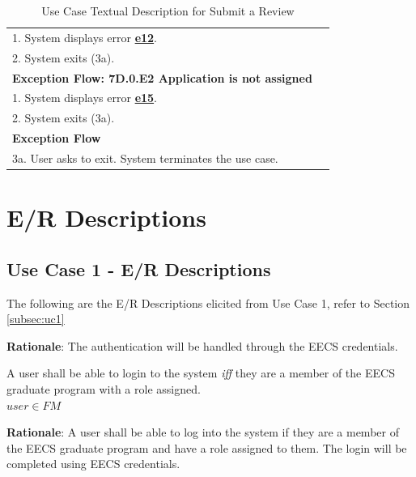 \documentclass[fontsize=12pt,paper=letter,twoside]{scrartcl}
\begin{document}
\begin{table}[!htb]
\begin{center}
\begin{tabular}{|l|l|}
\\ 1. System displays error  \hyperref[app:error]{\textbf{e12}}.
\\ 2. System exits (3a). \\ \hline 
\textbf{Exception Flow: 7D.0.E2 Application is not assigned}
\\ 1. System displays error \hyperref[app:error]{\textbf{e15}}.
\\ 2. System exits (3a). \\ \hline
\textbf{Exception Flow}
\\ 3a. User asks to exit. System terminates the use case.\\ \hline
\end{tabular}
\end{center}
\caption {Use Case Textual Description for Submit a Review}
\label{tbl:uc7Dtd}
\end{table}


\clearpage
\newpage
\section{E/R Descriptions}

\subsection{Use Case 1 - E/R Descriptions}

The following are the E/R Descriptions elicited from Use Case 1, refer to Section \ref{subsec:uc1}

\label{E1}

\smallskip
\noindent \textbf{Rationale}: The authentication will be handled through the EECS credentials.

\rdescription
{A user shall be able to login to the system \emph{iff} they are a member of the EECS graduate program with a role assigned.\\}
{$user \in FM$}
\label{R1}

\smallskip
\noindent \textbf{Rationale}: A user shall be able to log into the system if they are a member of the EECS graduate program and have a role assigned to them. The login will be completed using EECS credentials.
\end{document}
